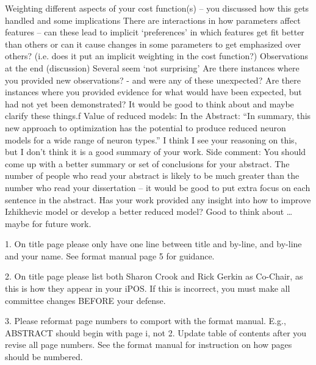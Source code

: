 Weighting different aspects of your cost function(s) – you discussed how this gets handled and some implications
There are interactions in how parameters affect features – can these lead to implicit ‘preferences’ in which features get fit better than others or can it cause changes in some parameters to get emphasized over others? (i.e. does it put an implicit weighting in the cost function?)
Observations at the end (discussion)
Several seem ‘not surprising’
Are there instances where you provided new observations?  - and were any of these unexpected? 
Are there instances where you provided evidence for what would have been expected, but had not yet been demonstrated?
It would be good to think about and maybe clarify these things.f
Value of reduced models:
In the Abstract:
“In summary, this new approach to optimization has the potential to produce reduced neuron models for a wide range of neuron types.”
I think I see your reasoning on this, but I don’t think it is a good summary of your work. 
Side comment:  You should come up with a better summary or set of conclusions for your abstract.  The number of people who read your abstract is likely to be much greater than the number who read your dissertation – it would be good to put extra focus on each sentence in the abstract.
Has your work provided any insight into how to improve Izhikhevic model or develop a better reduced model?  Good to think about … maybe for future work.
 
 


1. On title page please only have one line between title and by-line, and by-line and your name. See format manual page 5 for guidance. 

2. On title page please list both Sharon Crook and Rick Gerkin as Co-Chair, as this is how they appear in your iPOS. If this is incorrect, you must make all committee changes BEFORE your defense. 

3. Please reformat page numbers to comport with the format manual. E.g., ABSTRACT should begin with page i, not 2. Update table of contents after you revise all page numbers. See the format manual for instruction on how pages should be numbered. 


